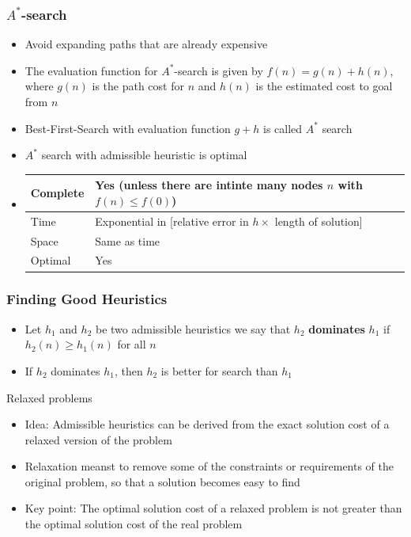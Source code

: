 \documentclass{scrartcl}
\begin{document}
\subsubsection{$A^*$-search}
\begin{itemize}
    \item
        Avoid expanding paths that are already expensive
    \item
        The evaluation function for $A^*$-search is given by $f(n) = g(n) + h(n)$, where $g(n)$ is the path cost for $n$ and $h(n)$ is the estimated cost to goal from $n$
    \item
        Best-First-Search with evaluation function $g+h$ is called $A^*$ search
    \item
        $A^*$ search with admissible heuristic is optimal
    \item
        \begin{tabular}{|l|l|}
            \hline
            Complete & Yes (unless there are intinte many nodes $n$ with $f(n)\leq f(0)$)\\ \hline
            Time & Exponential in [relative error in $h \times$ length of solution]\\ \hline
            Space & Same as time\\ \hline
            Optimal & Yes \\ \hline
        \end{tabular}
\end{itemize}
\subsubsection{Finding Good Heuristics}
\begin{itemize}
    \item
        Let $h_1$ and $h_2$ be two admissible heuristics we say that $h_2$ \textbf{dominates} $h_1$ if $h_2(n) \geq h_1(n)$ for all $n$
    \item
        If $h_2$ dominates $h_1$, then $h_2$ is better for search than $h_1$
\end{itemize}
Relaxed problems
\begin{itemize}
    \item
        Idea: Admissible heuristics can be derived from the exact solution cost of a relaxed version of the problem
    \item
        Relaxation meanst to remove some of the constraints or requirements of the original problem, so that a solution becomes easy to find
    \item
        Key point: The optimal solution cost of a relaxed problem is not greater than the optimal solution cost of the real problem
\end{itemize}
\end{document}
